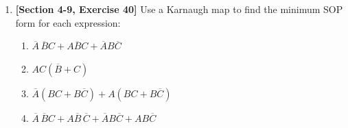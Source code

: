 \documentclass[11pt]{article}
\begin{document}
\begin{enumerate}
\item \textbf{[Section 4-9, Exercise 40]}
Use a Karnaugh map to find the minimum SOP form for each expression:
\begin{enumerate}[label=(\alph*)]
    \item $\overline{A}\,\overline{B}C
          +A\overline{B}C
          +\overline{A}B\overline{C}$
    \item $AC(\overline{B}+C)$
    \item $\overline{A}(BC+B\overline{C})
          +A(BC+B\overline{C})$
    \item $\overline{A}\,\overline{B}C
          +A\overline{B}\,\overline{C}
          +\overline{A}B\overline{C}
          +AB\overline{C}$
\end{enumerate}

\end{enumerate}
\end{document}
